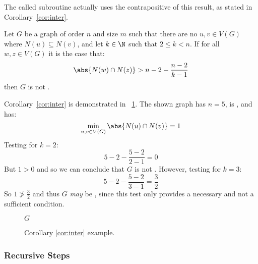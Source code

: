 The called subroutine actually uses the contrapositive of this result, as stated in Corollary~\ref{cor:inter}.

\begin{corollary}
  \label{cor:inter}
  Let \(G\) be a graph of order \(n\) and size \(m\) such that there are no \(u,v\in V(G)\) where
  \(N(u)\subseteq N(v)\), and let \(k\in\N\) such that \(2\le k<n\).  If for all \(w,z\in V(G)\) it is the case
  that:
  \[\abs{N(w)\cap N(z)}>n-2-\frac{n-2}{k-1}\]
  then \(G\) is not .
\end{corollary}

Corollary~\ref{cor:inter} is demonstrated in \figurename~\ref{fig:inter}.  The shown graph has \(n=5\), is
, and has:
\[\min_{u,v\in V(G)}\abs{N(u)\cap N(v)}=1\]
Testing for \(k=2\):
\[5-2-\frac{5-2}{2-1}=0\]
But \(1>0\) and so we can conclude that \(G\) is not .  However, testing for \(k=3\):
\[5-2-\frac{5-2}{3-1}=\frac{3}{2}\]
So \(1\ngtr\frac{3}{2}\) and thus \(G\) \emph{may} be , since this test only provides a necessary and
not a sufficient condition.

\begin{figure}[H]
  \centering

  \(G\)
  \caption{Corollary \ref{cor:inter} example.}
  \label{fig:inter}
\end{figure}

\subsubsection{Recursive Steps}

